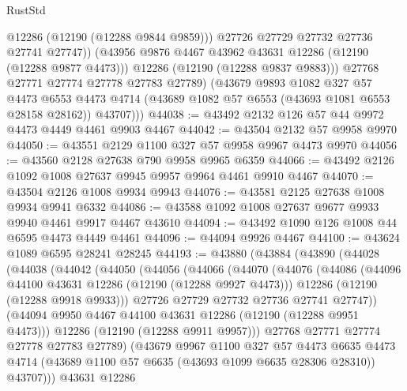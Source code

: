 \begin{lexlean}{RustStd}
\begin{coremodule}
                  @12286
                  (@12190 (@12288 @9844 @9859)))
                @27726
                @27729
                @27732
                @27736
                @27741
                @27747))
            (@43956 @9876 @4467 @43962 @43631 @12286 (@12190 (@12288 @9877 @4473)))
            @12286
            (@12190 (@12288 @9837 @9883)))
          @27768
          @27771
          @27774
          @27778
          @27783
          @27789)
        (@43679
          @9893
          @1082
          @327
          @57
          @4473
          @6553
          @4473
          @4714
          (@43689 @1082 @57 @6553 (@43693 @1081 @6553 @28158 @28162))
          @43707)))
@44038 := @43492 @2132 @126 @57 @44 @9972 @4473 @4449 @4461 @9903 @4467
@44042 := @43504 @2132 @57 @9958 @9970
@44050 := @43551 @2129 @1100 @327 @57 @9958 @9967 @4473 @9970
@44056 := @43560 @2128 @27638 @790 @9958 @9965 @6359
@44066 := @43492 @2126 @1092 @1008 @27637 @9945 @9957 @9964 @4461 @9910 @4467
@44070 := @43504 @2126 @1008 @9934 @9943
@44076 := @43581 @2125 @27638 @1008 @9934 @9941 @6332
@44086 := @43588 @1092 @1008 @27637 @9677 @9933 @9940 @4461 @9917 @4467 @43610
@44094 := @43492 @1090 @126 @1008 @44 @6595 @4473 @4449 @4461
@44096 := @44094 @9926 @4467
@44100 := @43624 @1089 @6595 @28241 @28245
@44193 := @43880
    (@43884
      (@43890
        (@44028
          (@44038
            (@44042
              (@44050
                (@44056
                  (@44066
                    (@44070
                      (@44076
                        (@44086
                          (@44096 @44100 @43631 @12286 (@12190 (@12288 @9927 @4473)))
                          @12286
                          (@12190 (@12288 @9918 @9933)))
                        @27726
                        @27729
                        @27732
                        @27736
                        @27741
                        @27747))
                    (@44094 @9950 @4467 @44100 @43631 @12286 (@12190 (@12288 @9951 @4473)))
                    @12286
                    (@12190 (@12288 @9911 @9957)))
                  @27768
                  @27771
                  @27774
                  @27778
                  @27783
                  @27789)
                (@43679
                  @9967
                  @1100
                  @327
                  @57
                  @4473
                  @6635
                  @4473
                  @4714
                  (@43689 @1100 @57 @6635 (@43693 @1099 @6635 @28306 @28310))
                  @43707)))
            @43631
            @12286

\end{coremodule}
\end{lexlean}
